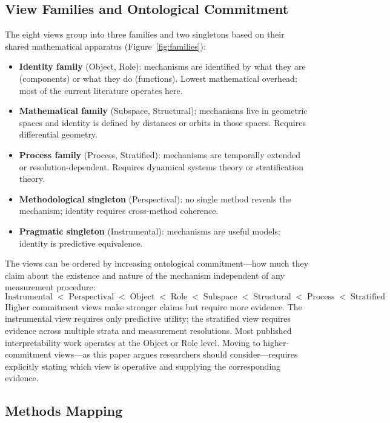 \documentclass[11pt]{article}
\theoremstyle{remark}
\begin{document}
\subsection{View Families and Ontological Commitment}\label{sec:families}

The eight views group into three families and two singletons based on
their shared mathematical apparatus (Figure~\ref{fig:families}):

\begin{itemize}[leftmargin=*]
\item \textbf{Identity family} (Object, Role): mechanisms are identified
      by what they are (components) or what they do (functions).  Lowest
      mathematical overhead; most of the current literature operates here.
\item \textbf{Mathematical family} (Subspace, Structural): mechanisms
      live in geometric spaces and identity is defined by distances or
      orbits in those spaces.  Requires differential geometry.
\item \textbf{Process family} (Process, Stratified): mechanisms are
      temporally extended or resolution-dependent.  Requires dynamical
      systems theory or stratification theory.
\item \textbf{Methodological singleton} (Perspectival): no single
      method reveals the mechanism; identity requires cross-method
      coherence.
\item \textbf{Pragmatic singleton} (Instrumental): mechanisms are useful
      models; identity is predictive equivalence.
\end{itemize}

The views can be ordered by increasing ontological commitment---how much
they claim about the existence and nature of the mechanism independent of
any measurement procedure:
\[
\text{Instrumental} \;<\; \text{Perspectival} \;<\; \text{Object} \;<\;
\text{Role} \;<\; \text{Subspace} \;<\; \text{Structural} \;<\;
\text{Process} \;<\; \text{Stratified}
\]
Higher commitment views make stronger claims but require more evidence.
The instrumental view requires only predictive utility; the stratified
view requires evidence across multiple strata and measurement resolutions.
Most published interpretability work operates at the Object or Role level.
Moving to higher-commitment views---as this paper argues researchers
should consider---requires explicitly stating which view is operative and
supplying the corresponding evidence.

\subsection{Methods Mapping}\label{sec:methods}
\end{document}
